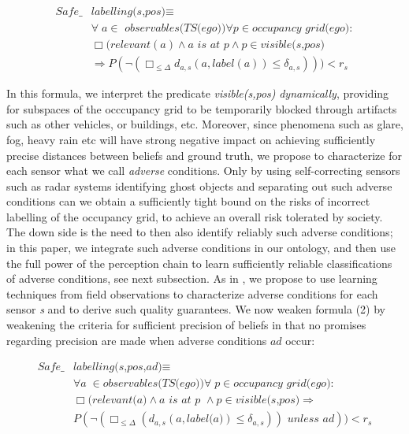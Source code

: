 \begin{align}\label{eq:safelabelling(s,pos)}
    \textit{Safe}\_&\textit{labelling(s,pos)} \equiv 					\\		
 & \forall a\in\textit{ observables(TS(ego))}\forall p \in \textit{occupancy grid(ego)}:\nonumber\\  
& \Box (\textit{relevant}(a) \land a \textit{ is at } p\land p\in \textit{visible(s,pos)} \nonumber\\
& \Rightarrow P(\neg( \Box_{\leq\Delta} d_{a,s}(a,\textit{label}(a))\leq\delta_{a,s}))) < r_s\nonumber
\end{align}

In this formula, we interpret the predicate \textit{visible(s,pos)} \emph{dynamically}, providing for subspaces of the occcupancy grid to be temporarily blocked through artifacts such as other vehicles, or buildings, etc. Moreover, since phenomena such as glare, fog, heavy rain etc will have strong negative impact on achieving sufficiently precise distances between beliefs and ground truth, we propose to characterize for each sensor what we call \emph{adverse} conditions. Only by using self-correcting sensors such as radar systems identifying ghost objects and separating out such adverse conditions can we obtain a sufficiently tight bound on the risks of incorrect labelling of the occupancy grid, to achieve an overall risk tolerated by society. The down side is the need to then also identify reliably such adverse conditions; in this paper, we integrate such adverse conditions in our ontology, and then use the full power of the perception chain to learn sufficiently reliable classifications of adverse conditions, see next subsection. As in \cite{galbas}, we propose to use learning techniques from field observations to characterize adverse conditions for each sensor \textit{s} and to derive such quality guarantees. We now weaken formula (2) by weakening the criteria for sufficient precision of beliefs in that no promises regarding precision are made when adverse conditions $ad$ occur:

\begin{align}\label{eq:safelabelling(s,pos,ad)}
\textit{Safe}\_&\textit{labelling(s,pos,ad)} \equiv\\  			
&\forall a\in \textit{observables(TS(ego))}\forall p\in\textit{occupancy grid(ego)}\nonumber:\\
&\Box(\textit{relevant(a)} \land a\textit{ is at p }\land p\in\textit{visible(s,pos)} \Rightarrow\nonumber\\
&P(\neg(\Box_{\leq\Delta} (d_{a,s}(a, \textit{label(a)})\leq \delta_{a,s}))\textit{ unless } ad)) < r_s\nonumber
\end{align}

